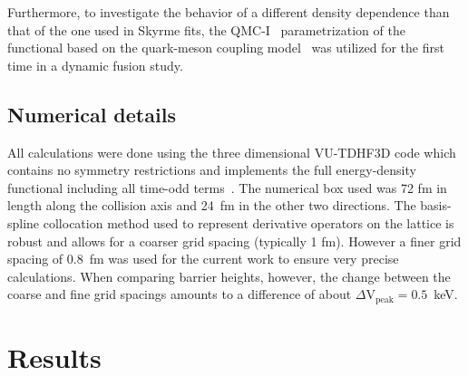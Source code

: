 Furthermore, to investigate the behavior of a different density dependence than that of the one used in Skyrme fits, the QMC-I~\protect\citep{stone2016} parametrization of the functional based on the quark-meson coupling model~\protect\citep{guichon1988,guichon1996} was utilized for the first time in a dynamic fusion study.

\subsection{Numerical details}

All calculations were done using the three dimensional VU-TDHF3D code which contains no symmetry restrictions and implements the full energy-density functional including all time-odd terms~\protect\citep{umar2006c}. 
The numerical box used was 72 fm in length along the collision axis and 24~fm in the other two directions.
The basis-spline collocation method used to represent derivative operators on the lattice is robust and allows for a coarser grid spacing (typically 1 fm).
However a finer grid spacing of 0.8~fm was used for the current work to ensure very precise calculations. 
When comparing barrier heights, however, the change between the coarse and fine grid spacings amounts to a difference of about $\Delta \mathrm{V}_{\mathrm{peak}}=0.5$~keV.

\section{Results}
\label{cc:sec:res}

